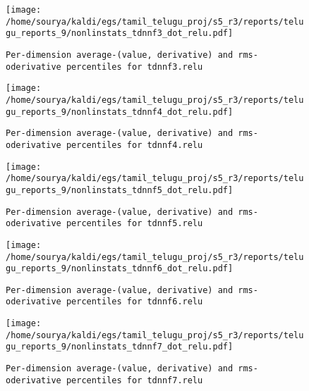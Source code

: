 \documentclass[prl,10pt,twocolumn]{revtex4}
\begin{document}
\newpage
\begin{figure}[h]
  \begin{center}
    \caption{\texttt{Per-dimension average-(value, derivative) and rms-oderivative percentiles for tdnnf3.relu}}
    \texttt{[image: /home/sourya/kaldi/egs/tamil\_telugu\_proj/s5\_r3/reports/telugu\_reports\_9/nonlinstats\_tdnnf3\_dot\_relu.pdf]}
  \end{center}
\end{figure}
\clearpage


\newpage
\begin{figure}[h]
  \begin{center}
    \caption{\texttt{Per-dimension average-(value, derivative) and rms-oderivative percentiles for tdnnf4.relu}}
    \texttt{[image: /home/sourya/kaldi/egs/tamil\_telugu\_proj/s5\_r3/reports/telugu\_reports\_9/nonlinstats\_tdnnf4\_dot\_relu.pdf]}
  \end{center}
\end{figure}
\clearpage


\newpage
\begin{figure}[h]
  \begin{center}
    \caption{\texttt{Per-dimension average-(value, derivative) and rms-oderivative percentiles for tdnnf5.relu}}
    \texttt{[image: /home/sourya/kaldi/egs/tamil\_telugu\_proj/s5\_r3/reports/telugu\_reports\_9/nonlinstats\_tdnnf5\_dot\_relu.pdf]}
  \end{center}
\end{figure}
\clearpage


\newpage
\begin{figure}[h]
  \begin{center}
    \caption{\texttt{Per-dimension average-(value, derivative) and rms-oderivative percentiles for tdnnf6.relu}}
    \texttt{[image: /home/sourya/kaldi/egs/tamil\_telugu\_proj/s5\_r3/reports/telugu\_reports\_9/nonlinstats\_tdnnf6\_dot\_relu.pdf]}
  \end{center}
\end{figure}
\clearpage


\newpage
\begin{figure}[h]
  \begin{center}
    \caption{\texttt{Per-dimension average-(value, derivative) and rms-oderivative percentiles for tdnnf7.relu}}
    \texttt{[image: /home/sourya/kaldi/egs/tamil\_telugu\_proj/s5\_r3/reports/telugu\_reports\_9/nonlinstats\_tdnnf7\_dot\_relu.pdf]}
  \end{center}
\end{figure}
\clearpage
\end{document}
